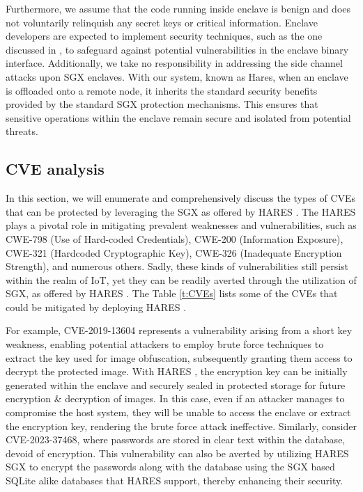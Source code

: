 \documentclass[article, doublespace,nopageskip]{VTthesis} %
\newcommand{\monitor}{HARES }
\begin{document}
    Furthermore, we assume that the code running inside enclave is benign and does not voluntarily relinquish any secret keys or critical information. Enclave developers are expected to implement security techniques, such as the one discussed in \cite{Protecting, SGX-Defense}, to safeguard against potential vulnerabilities in the enclave binary interface. Additionally, we take no responsibility in addressing the side channel attacks upon SGX enclaves. With our system, known as Hares, when an enclave is offloaded onto a remote node, it inherits the standard security benefits provided by the standard SGX protection mechanisms. This ensures that sensitive operations within the enclave remain secure and isolated from potential threats.

    \subsection{CVE analysis}
    In this section, we will enumerate and comprehensively discuss the types of CVEs that can be protected by leveraging the SGX as offered by \monitor. The \monitor plays a pivotal role in mitigating prevalent weaknesses and vulnerabilities, such as CWE-798 (Use of Hard-coded Credentials), CWE-200 (Information Exposure), CWE-321 (Hardcoded Cryptographic Key), CWE-326 (Inadequate Encryption Strength), and numerous others. Sadly, these kinds of vulnerabilities still persist within the realm of IoT, yet they can be readily averted through the utilization of SGX, as offered by \monitor. The Table \ref{t:CVEs} lists some of the CVEs that could be mitigated by deploying \monitor.

    For example, CVE-2019-13604 represents a vulnerability arising from a short key weakness, enabling potential attackers to employ brute force techniques to extract the key used for image obfuscation, subsequently granting them access to decrypt the protected image. With \monitor, the encryption key can be initially generated within the enclave and securely sealed in protected storage for future encryption \& decryption of images. In this case, even if an attacker manages to compromise the host system, they will be unable to access the enclave or extract the encryption key, rendering the brute force attack ineffective. Similarly, consider CVE-2023-37468, where passwords are stored in clear text within the database, devoid of encryption. This vulnerability can also be averted by utilizing \monitor SGX to encrypt the passwords along with the database using the SGX based SQLite alike databases that \monitor support, thereby enhancing their security.
\end{document}
